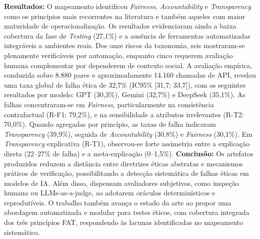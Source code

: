 \textbf{Resultados:} O mapeamento identificou \textit{Fairness}, \textit{Accountability} e \textit{Transparency} como os princípios mais recorrentes na literatura e também aqueles com maior maturidade de operacionalização. Os resultados evidenciaram ainda a baixa cobertura da fase de \textit{Testing} (27,1\%) e a ausência de ferramentas automatizadas integráveis a ambientes reais. Dos onze riscos da taxonomia, seis mostraram-se plenamente verificáveis por automação, enquanto cinco requerem avaliação humana complementar por dependerem de contexto social. A avaliação empírica, conduzida sobre 8.880 pares e aproximadamente 14.160 chamadas de API, revelou uma taxa global de falha ética de 32,7\% (IC95\% [31,7; 33,7]), com os seguintes resultados por modelo: GPT (30,3\%), Gemini (32,7\%) e DeepSeek (35,1\%). As falhas concentraram-se em \textit{Fairness}, particularmente na consistência contrafactual (R-F1: 79,2\%), e na sensibilidade a atributos irrelevantes (R-T2: 70,0\%). Quando agregadas por princípio, as taxas de falha indicaram \textit{Transparency} (39,9\%), seguida de \textit{Accountability} (30,8\%) e \textit{Fairness} (30,1\%). Em \textit{Transparency} explicativa (R-T1), observou-se forte assimetria entre a explicação direta (22--27\% de falha) e a meta-explicação (0--1,5\%).
\textbf{Conclusão:} Os artefatos produzidos reduzem a distância entre diretrizes éticas abstratas e mecanismos práticos de verificação, possibilitando a detecção sistemática de falhas éticas em modelos de IA. Além disso, dispensam avaliadores subjetivos, como inspeção humana ou LLMs-as-a-judge, ao adotarem oráculos determinísticos e reprodutíveis. O trabalho também avança o estado da arte ao propor uma abordagem automatizada e modular para testes éticos, com cobertura integrada dos três princípios FAT, respondendo às lacunas identificadas no mapeamento sistemático.
